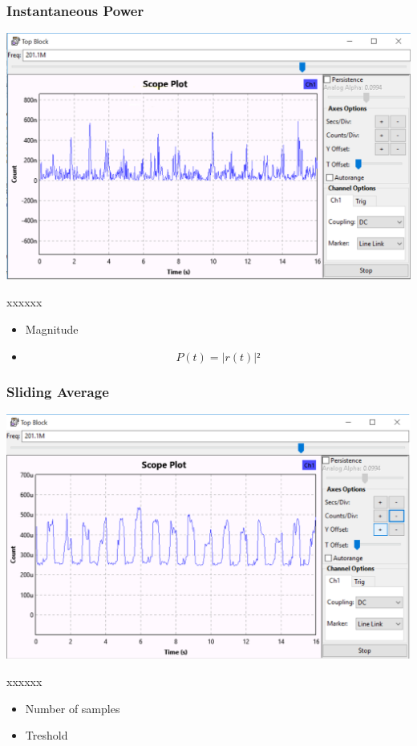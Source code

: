 \begin{frame}
	\frametitle{Instantaneous Power}
	\centering \includegraphics[scale=.2]{images/apres_mag2.png}
	\begin{block}{xxxxxx}
		\begin{itemize}
			\item Magnitude
			\item \[P(t)=|r(t)|²\]
		\end{itemize}
	\end{block}
\end{frame}

\begin{frame}
	\frametitle{Sliding Average}
	\centering \includegraphics[scale=.2]{images/apres_average.png}
	\begin{block}{xxxxxx}
		\begin{itemize}
			\item Number of samples
			\item Treshold
		\end{itemize}
	\end{block}
\end{frame}


